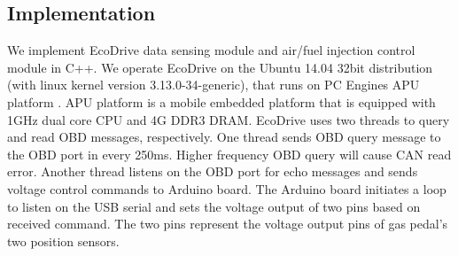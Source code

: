 \vfill\eject

\subsection{Implementation}


We implement EcoDrive data sensing module and air/fuel
injection control module in C++. 
We operate EcoDrive on the Ubuntu 14.04 32bit distribution 
(with linux kernel version 3.13.0-34-generic), 
that runs on PC Engines APU platform \cite{apu}. 
APU platform is a mobile embedded platform that 
is equipped with 1GHz dual core CPU and 4G DDR3 DRAM. 
EcoDrive uses two threads to
query and read OBD messages, respectively. 
One thread sends OBD query message to the OBD port in every 250ms.
Higher frequency OBD query will cause CAN read error. 
Another thread listens on the OBD port for 
echo messages and sends voltage control commands to 
Arduino board. 
The Arduino board initiates a loop to listen on the USB 
serial and sets the voltage output of two pins 
based on received command. 
The two pins represent the voltage output pins
of gas pedal's two position sensors. 



